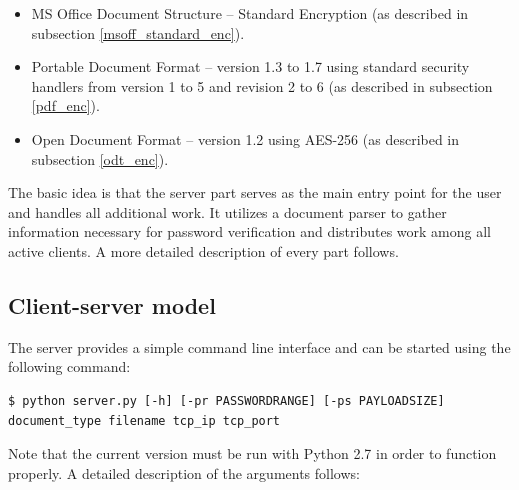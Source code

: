 \documentclass[11pt,oneside]{fithesis2}
\begin{document}
\begin{itemize}
\setlength\itemsep{0.1em}
	\item{MS Office Document Structure -- Standard Encryption (as described in subsection \ref{msoff_standard_enc}).}
	\item{Portable Document Format --  version 1.3 to 1.7 using standard security handlers from version 1 to 5 and revision 2 to 6 (as described in subsection \ref{pdf_enc}).}
	\item{Open Document Format – version 1.2 using AES-256 (as described in subsection \ref{odt_enc}).}
\end{itemize}

The basic idea is that the server part serves as the main entry point for the user and handles all additional work. It utilizes a document parser to gather information necessary for password verification and distributes work among all active clients. A more detailed description of every part follows. 

\subsection{Client-server model}\label{client-server}

The server provides a simple command line interface and can be started using the following command: 

\begin{lstlisting}
$ python server.py [-h] [-pr PASSWORDRANGE] [-ps PAYLOADSIZE] document_type filename tcp_ip tcp_port
\end{lstlisting}

Note that the current version must be run with Python 2.7 in order to function properly. A detailed description of the arguments follows:
\end{document}

